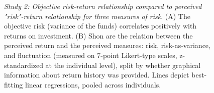 \documentclass[a4paper,man, natbib,floatsintext]{apa6} %
\begin{document}


%
\begin{figure}[h!] 
 \centering
  \caption{\textit{Study 2: Objective risk-return relationship compared to perceived "risk"-return relationship for three measures of risk}. (A) The objective risk (variance of the funds) correlates positively with returns on investment. (B) Shon are the relation between the perceived return and the perceived measures: risk, risk-as-variance, and fluctuation (measured on 7-point Likert-type scales, z-standardized at the individual level), split by whether graphical information about return history was provided. Lines depict best-fitting linear regressions, pooled across individuals.}
  \label{fig:study2_rrc}
\end{figure}
%


\clearpage
\end{document}

